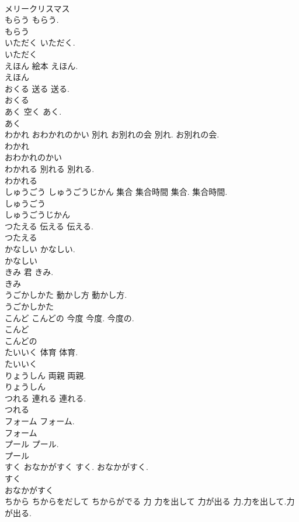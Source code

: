 \documentclass[8pt]{extreport}
\begin{document}
\begin{CJK}{UTF8}{min}
\\	メリークリスマス
\\	もらう		もらう.	
\\	もらう
\\	いただく		いただく.	
\\	いただく
\\	えほん	絵本	えほん.	
\\	えほん
\\	おくる	送る	送る.	
\\	おくる
\\	あく	空く	あく.	
\\	あく
\\	わかれ おわかれのかい	別れ お別れの会	別れ. お別れの会.	
\\	わかれ
\\	おわかれのかい
\\	わかれる	別れる	別れる.	
\\	わかれる
\\	しゅうごう しゅうごうじかん	集合 集合時間	集合. 集合時間.	
\\	しゅうごう
\\	しゅうごうじかん
\\	つたえる	伝える	伝える.	
\\	つたえる
\\	かなしい		かなしい.	
\\	かなしい
\\	きみ	君	きみ.	
\\	きみ
\\	うごかしかた	動かし方	動かし方.	
\\	うごかしかた
\\	こんど こんどの	今度	今度. 今度の.	
\\	こんど
\\	こんどの
\\	たいいく	体育	体育.	
\\	たいいく
\\	りょうしん	両親	両親.	
\\	りょうしん
\\	つれる	連れる	連れる.	
\\	つれる
\\	フォーム		フォーム.	
\\	フォーム
\\	プール		プール.	
\\	プール
\\	すく おなかがすく		すく. おなかがすく.	
\\	すく
\\	おなかがすく
\\	ちから ちからをだして ちからがでる	力 力を出して 力が出る	力.力を出して.力が出る.	

\end{CJK}
\end{document}

